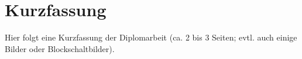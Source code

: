 
\chapter{Kurzfassung}

Hier folgt eine Kurzfassung der Diplomarbeit (ca. 2 bis 3 Seiten;
evtl. auch einige Bilder oder Blockschaltbilder).
